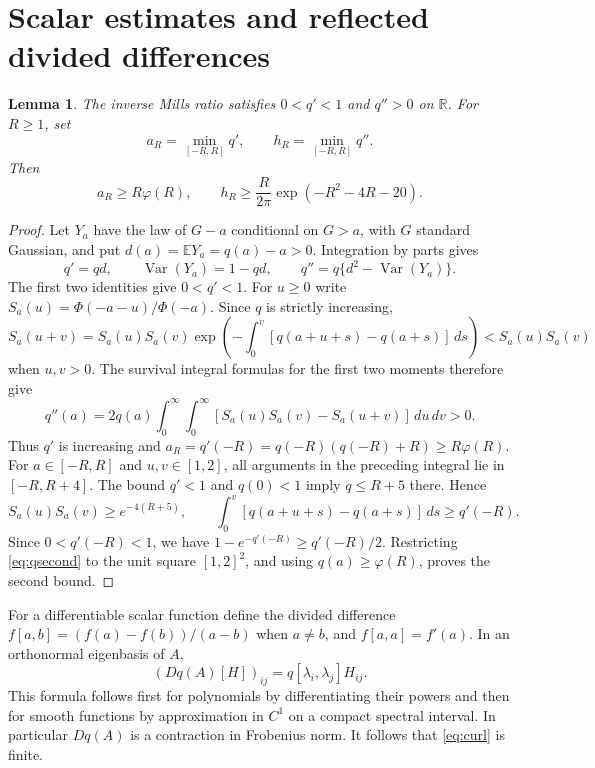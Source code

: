 \documentclass[11pt,reqno]{amsart}
\numberwithin{equation}{section}
\newtheorem{lemma}[theorem]{Lemma}
\theoremstyle{remark}
\newcommand{\E}{\mathbb E}
\newcommand{\R}{\mathbb R}
\DeclareMathOperator{\Var}{Var}
\begin{document}
\section{Scalar estimates and reflected divided differences}
\begin{lemma}\label{lem:scalar}
The inverse Mills ratio satisfies $0<q'<1$ and $q''>0$ on $\R$.
For $R\ge1$, set
\[
 a_R=\min_{[-R,R]}q',\qquad h_R=\min_{[-R,R]}q''.
\]
Then
\begin{equation}\label{eq:scalarbounds}
 a_R\ge R\varphi(R),\qquad
 h_R\ge\frac{R}{2\pi}\exp(-R^2-4R-20).
\end{equation}
\end{lemma}
\begin{proof}
Let $Y_a$ have the law of $G-a$ conditional on $G>a$, with $G$ standard
Gaussian, and put $d(a)=\E Y_a=q(a)-a>0$. Integration by parts gives
\[
 q'=qd,\qquad \Var(Y_a)=1-qd,\qquad
 q''=q\{d^2-\Var(Y_a)\}.
\]
The first two identities give $0<q'<1$. For $u\ge0$ write
$S_a(u)=\Phi(-a-u)/\Phi(-a)$. Since $q$ is strictly increasing,
\[
 S_a(u+v)=S_a(u)S_a(v)\exp\left(-\int_0^v
               [q(a+u+s)-q(a+s)]\,ds\right)
 <S_a(u)S_a(v)
\]
when $u,v>0$. The survival integral formulas for the first two moments
therefore give
\begin{equation}\label{eq:qsecond}
 q''(a)=2q(a)\int_0^\infty\int_0^\infty
       [S_a(u)S_a(v)-S_a(u+v)]\,du\,dv>0.
\end{equation}
Thus $q'$ is increasing and
$a_R=q'(-R)=q(-R)(q(-R)+R)\ge R\varphi(R)$.
For $a\in[-R,R]$ and $u,v\in[1,2]$, all arguments in the preceding
integral lie in $[-R,R+4]$. The bound $q'<1$ and $q(0)<1$ imply
$q\le R+5$ there. Hence
\[
 S_a(u)S_a(v)\ge e^{-4(R+5)},\qquad
 \int_0^v[q(a+u+s)-q(a+s)]\,ds\ge q'(-R).
\]
Since $0<q'(-R)<1$, we have $1-e^{-q'(-R)}\ge q'(-R)/2$.
Restricting \eqref{eq:qsecond} to the unit square $[1,2]^2$, and using
$q(a)\ge\varphi(R)$, proves the second bound.
\end{proof}

For a differentiable scalar function define the divided difference
$f[a,b]=(f(a)-f(b))/(a-b)$ when $a\ne b$, and $f[a,a]=f'(a)$.
In an orthonormal eigenbasis of $A$,
\begin{equation}\label{eq:frechet}
 (Dq(A)[H])_{ij}=q[\lambda_i,\lambda_j]H_{ij}.
\end{equation}
This formula follows first for polynomials by differentiating their
powers and then for smooth functions by approximation in $C^1$ on a
compact spectral interval. In particular $Dq(A)$ is a contraction in
Frobenius norm. It follows that \eqref{eq:curl} is finite.
\end{document}
